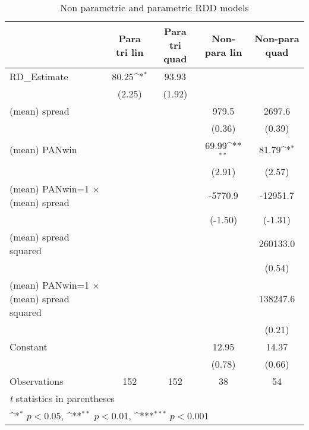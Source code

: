 \begin{table}[htbp]\centering
\def\sym#1{\ifmmode^{#1}\else\(^{#1}\)\fi}
\caption{Non parametric and parametric RDD models\label{tab:model2}}
\begin{tabular}{l*{4}{c}}
\toprule
                    &\multicolumn{1}{c}{Para tri lin}&\multicolumn{1}{c}{Para tri quad}&\multicolumn{1}{c}{Non-para lin}&\multicolumn{1}{c}{Non-para quad}\\
\midrule
RD\_Estimate         &       80.25\sym{*}  &       93.93         &                     &                     \\
                    &      (2.25)         &      (1.92)         &                     &                     \\
\addlinespace
(mean) spread       &                     &                     &       979.5         &      2697.6         \\
                    &                     &                     &      (0.36)         &      (0.39)         \\
\addlinespace
(mean) PANwin       &                     &                     &       69.99\sym{**} &       81.79\sym{*}  \\
                    &                     &                     &      (2.91)         &      (2.57)         \\
\addlinespace
(mean) PANwin=1 $\times$ (mean) spread&                     &                     &     -5770.9         &    -12951.7         \\
                    &                     &                     &     (-1.50)         &     (-1.31)         \\
\addlinespace
(mean) spread squared&                     &                     &                     &    260133.0         \\
                    &                     &                     &                     &      (0.54)         \\
\addlinespace
(mean) PANwin=1 $\times$ (mean) spread squared&                     &                     &                     &    138247.6         \\
                    &                     &                     &                     &      (0.21)         \\
\addlinespace
Constant            &                     &                     &       12.95         &       14.37         \\
                    &                     &                     &      (0.78)         &      (0.66)         \\
\midrule
Observations        &         152         &         152         &          38         &          54         \\
\bottomrule
\multicolumn{5}{l}{\footnotesize \textit{t} statistics in parentheses}\\
\multicolumn{5}{l}{\footnotesize \sym{*} \(p<0.05\), \sym{**} \(p<0.01\), \sym{***} \(p<0.001\)}\\
\end{tabular}
\end{table}
